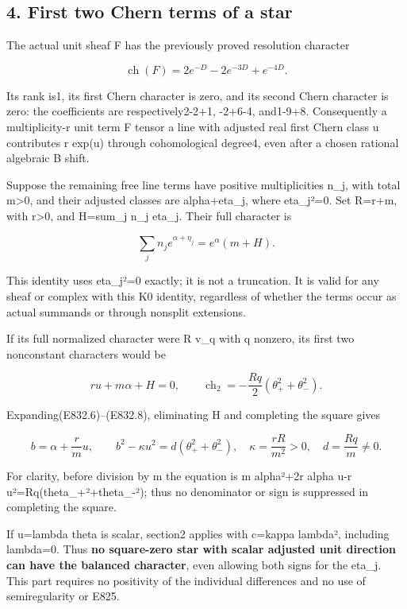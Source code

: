 \subsection{4. First two Chern terms of a
star}\label{SF-E832:first-two-chern-terms-of-a-star}

The actual unit sheaf F has the previously proved resolution character

\[
 \operatorname{ch}(F)=2e^{-D}-2e^{-3D}+e^{-4D}.
 \tag{E832.6}
\]

Its rank is1, its first Chern character is zero, and its second Chern
character is zero: the coefficients are respectively2-2+1, -2+6-4,
and1-9+8. Consequently a multiplicity-r unit term F tensor a line with
adjusted real first Chern class u contributes r exp(u) through
cohomological degree4, even after a chosen rational algebraic B shift.

Suppose the remaining free line terms have positive multiplicities n\_j,
with total m\textgreater0, and their adjusted classes are alpha+eta\_j,
where eta\_j²=0. Set R=r+m, with r\textgreater0, and H=sum\_j n\_j
eta\_j. Their full character is

\[
 \sum_jn_je^{\alpha+\eta_j}=e^\alpha(m+H).
 \tag{E832.7}
\]

This identity uses eta\_j²=0 exactly; it is not a truncation. It is
valid for any sheaf or complex with this K0 identity, regardless of
whether the terms occur as actual summands or through nonsplit
extensions.

If its full normalized character were R v\_q with q nonzero, its first
two nonconstant characters would be

\[
 ru+m\alpha+H=0,\qquad
 \operatorname{ch}_2=-\frac{Rq}{2}(\theta_+^2+\theta_-^2).
 \tag{E832.8}
\]

Expanding(E832.6)--(E832.8), eliminating H and completing the square
gives

\[
 b=\alpha+\frac r m u,\qquad
 b^2-\kappa u^2=d(\theta_+^2+\theta_-^2),
 \quad\kappa=\frac{rR}{m^2}>0,\quad d=\frac{Rq}{m}\ne0.
 \tag{E832.9}
\]

For clarity, before division by m the equation is m alpha²+2r alpha u-r
u²=Rq(theta\_+²+theta\_-²); thus no denominator or sign is suppressed in
completing the square.

If u=lambda theta is scalar, section2 applies with c=kappa lambda²,
including lambda=0. Thus \textbf{no square-zero star with scalar
adjusted unit direction can have the balanced character}, even allowing
both signs for the eta\_j. This part requires no positivity of the
individual differences and no use of semiregularity or E825.

